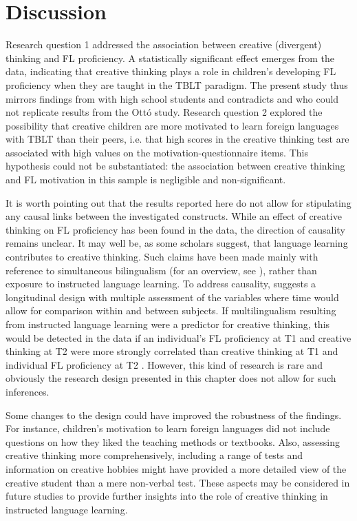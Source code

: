 \documentclass[output=paper]{langsci/langscibook}
\begin{document}
\section{Discussion}

Research question 1 addressed the association between creative (divergent) thinking and FL proficiency. A statistically significant effect emerges from the data, indicating that creative thinking plays a role in children’s developing FL proficiency when they are taught in the TBLT paradigm. The present study thus mirrors findings from \citet{Otto1998} with high school students and contradicts \citet{Albert2006} and \citet{AlbertKormos2011} who could not replicate results from the Ottó study. Research question 2 explored the possibility that creative children are more motivated to learn foreign languages with TBLT than their peers, i.e. that high scores in the creative thinking test are associated with high values on the motivation-questionnaire items. This hypothesis could not be substantiated: the association between creative thinking and FL motivation in this sample is negligible and non-significant. 

It is worth pointing out that the results reported here do not allow for stipulating any causal links between the investigated constructs. While an effect of creative thinking on FL proficiency has been found in the data, the direction of causality remains unclear. It may well be, as some scholars suggest, that language learning contributes to creative thinking. Such claims have been made mainly with reference to simultaneous bilingualism (for an overview, see \citealt{Ricciardelli1992}), rather than exposure to instructed language learning. To address causality, \citet{Simonton2008} suggests a longitudinal design with multiple assessment of the variables where time would allow for comparison within and between subjects. If multilingualism resulting from instructed language learning were a predictor for creative thinking, this would be detected in the data if an individual’s FL proficiency at T1 and creative thinking at T2 were more strongly correlated than creative thinking at T1 and individual FL proficiency at T2 \citep[154]{Simonton2008}. However, this kind of research is rare and obviously the research design presented in this chapter does not allow for such inferences.

Some changes to the design could have improved the robustness of the findings. For instance, children’s motivation to learn foreign languages did not include questions on how they liked the teaching methods or textbooks. Also, assessing creative thinking more comprehensively, including a range of tests and information on creative hobbies might have provided a more detailed view of the creative student than a mere non-verbal test. These aspects may be considered in future studies to provide further insights into the role of creative thinking in instructed language learning. 

{\sloppy\printbibliography[heading=subbibliography,notkeyword=this]}
\end{document}
